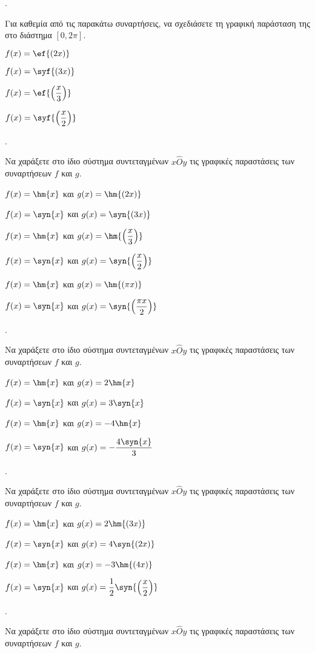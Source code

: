 \documentclass[11pt,a4paper,twocolumn]{article}
\newcounter{askhsh}
\newcommand{\askhsh}{{\large\theaskhsh.}\ \addtocounter{askhsh}{1}}
\begin{document}
\askhsh Για καθεμία από τις παρακάτω συναρτήσεις, να σχεδιάσετε τη γραφική παράσταση της στο διάστημα $[0,2\pi]$.
\begin{multicols}{2}
\begin{alist}
\item $f(x)=\ef{(2x)}$
\item $f(x)=\syf{(3x)}$
\item $f(x)=\ef{\left(\dfrac{x}{3}\right)}$
\item $f(x)=\syf{\left(\dfrac{x}{2}\right)}$
\end{alist}
\end{multicols}
\askhsh Να χαράξετε στο ίδιο σύστημα συντεταγμένων $x\hat{O}y$ τις γραφικές παραστάσεις των συναρτήσεων $f$ και $g$.
\begin{alist}
\item $f(x)=\hm{x}$ και $g(x)=\hm{(2x)}$
\item $f(x)=\syn{x}$ και $g(x)=\syn{(3x)}$
\item $f(x)=\hm{x}$ και $g(x)=\hm{\left(\dfrac{x}{3}\right)}$
\item $f(x)=\syn{x}$ και $g(x)=\syn{\left(\dfrac{x}{2}\right)}$
\item $f(x)=\hm{x}$ και $g(x)=\hm{(\pi x)}$
\item $f(x)=\syn{x}$ και $g(x)=\syn{\left(\dfrac{\pi x}{2}\right)}$
\end{alist}
\askhsh Να χαράξετε στο ίδιο σύστημα συντεταγμένων $x\hat{O}y$ τις γραφικές παραστάσεις των συναρτήσεων $f$ και $g$.
\begin{alist}
\item $f(x)=\hm{x}$ και $g(x)=2\hm{x}$
\item $f(x)=\syn{x}$ και $g(x)=3\syn{x}$
\item $f(x)=\hm{x}$ και $g(x)=-4\hm{x}$
\item $f(x)=\syn{x}$ και $g(x)=-\dfrac{4\syn{x}}{3}$
\end{alist}
\askhsh Να χαράξετε στο ίδιο σύστημα συντεταγμένων $x\hat{O}y$ τις γραφικές παραστάσεις των συναρτήσεων $f$ και $g$.
\begin{alist}
\item $f(x)=\hm{x}$ και $g(x)=2\hm{(3x)}$
\item $f(x)=\syn{x}$ και $g(x)=4\syn{(2x)}$
\item $f(x)=\hm{x}$ και $g(x)=-3\hm{(4x)}$
\item $f(x)=\syn{x}$ και $g(x)=\dfrac{1}{2}\syn{\left(\dfrac{x}{2}\right)}$
\end{alist}
\askhsh Να χαράξετε στο ίδιο σύστημα συντεταγμένων $x\hat{O}y$ τις γραφικές παραστάσεις των συναρτήσεων $f$ και $g$.
\end{document}
